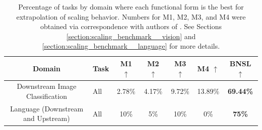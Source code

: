 \documentclass{article} %
\newcommand{\highlight}[1]{\colorbox{blue!10}{#1}}
\begin{document}
\begin{table}[hbt!]
    \centering
    \begin{tabular}{ |cH|c|c|c|c|c| } 
\hline
Domain & \hspace{.9cm}Task & M1 $\uparrow$ & M2 $\uparrow$ & M3 $\uparrow$ & M4 $\uparrow$ & BNSL $\uparrow$ \\
 \hline
 
Downstream Image Classification & All & 2.78\% & 4.17\% & 9.72\% & 13.89\% & \bfseries 69.44\%\\
 Language (Downstream and Upstream) & All & 10\% & 5\% & 10\% & 0\% & \bfseries 75\%\\
 \hline
\end{tabular}
\vspace{-1.1mm}
    \caption{
    Percentage of tasks by domain where each functional form is the best for extrapolation of scaling behavior. Numbers for M1, M2, M3, and M4 were obtained via correspondence with authors of \cite{Alabdulmohsi2022revisiting}. See Sections \ref{section:scaling_benchmark__vision} and \ref{section:scaling_benchmark__language} for more details.
    }
    \label{table:scaling_laws_benchmark_dataset__summary}
\end{table}
\end{document}
